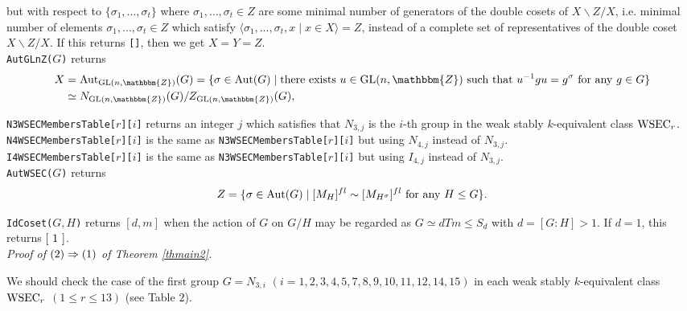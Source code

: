 \documentclass{amsart}
\theoremstyle{plain}
\theoremstyle{definition}
\theoremstyle{remark}
\newcommand{\bZ}{\mathbbm{Z}}\newcommand{\bQ}{\mathbbm{Q}}
\newcommand{\GL}{{\rm GL}}\newcommand{\SL}{{\rm SL}}
\begin{document}
but with respect to 
$\{\sigma_1,\ldots,\sigma_t\}$ 
where $\sigma_1,\ldots,\sigma_t\in Z$ are some minimal number of generators 
of the double cosets of $X\backslash Z/X$, i.e. 
minimal number of elements $\sigma_1,\ldots,\sigma_t\in Z$ 
which satisfy $\langle \sigma_1,\ldots,\sigma_t,x\mid x\in X\rangle=Z$, 
instead of a complete set of representatives 
of the double coset $X\backslash Z/X$. 
If this returns {\tt []}, then we get $X=Y=Z$.\\

\noindent 
{\tt AutGLnZ(}$G${\tt )} 
returns 
\begin{align*}
X&={\rm Aut}_{\GL(n,\bZ)}(G)=
\{\sigma\in{\rm Aut}(G)\mid 
{\rm there}\ {\rm exists}\ u\in {\rm GL}(n,\bZ)\ {\rm such}\ {\rm that}\ 
u^{-1}gu=g^\sigma\ {\rm for}\ {\rm any}\ g\in G\}\\
&\simeq N_{\GL(n,\bZ)}(G)/Z_{\GL(n,\bZ)}(G),
\end{align*}

\noindent 
{\tt N3WSECMembersTable[}$r${\tt ][}$i${\tt ]} 
returns an integer $j$ which satisfies that $N_{3,j}$ is 
the $i$-th group in the weak stably $k$-equivalent class ${\rm WSEC}_r$.\\

\noindent 
{\tt N4WSECMembersTable[}$r${\tt ][}$i${\tt ]} 
is the same as 
{\tt N3WSECMembersTable[}$r${\tt ][}$i${\tt ]} 
but using $N_{4,j}$ instead of $N_{3,j}$.\\

\noindent 
{\tt I4WSECMembersTable[}$r${\tt ][}$i${\tt ]} 
is the same as 
{\tt N3WSECMembersTable[}$r${\tt ][}$i${\tt ]} 
but using $I_{4,j}$ instead of $N_{3,j}$.\\

\noindent 
{\tt AutWSEC(}$G${\tt )} 
returns 
\begin{align*}
Z=\{\sigma\in{\rm Aut}(G)\mid [M_H]^{fl}\sim [M_{H^\sigma}]^{fl}\ {\rm for}\ {\rm any}\ H\leq G\}. 
\end{align*}

\noindent 
{\tt IdCoset(}$G,H${\tt )} 
returns $[d,m]$ when the action of $G$ on $G/H$ may be regarded 
as $G\simeq dTm\leq S_d$ with $d=[G:H]>1$. 
If $d=1$, this returns ${\tt [}\ 1\ {\tt ]}$.\\

{\it Proof of ${\rm (2)}\Rightarrow {\rm (1)}$ of {Theorem \ref{thmain2}}.}

%
We should check the case of the first group $G=N_{3,i}$ 
$(i=1,2,3,4,5,7,8,9,10,11,12,14,15)$ in each weak stably $k$-equivalent class 
${\rm WSEC}_r$ $(1\leq r\leq 13)$ (see Table $2$). 
\end{document}
